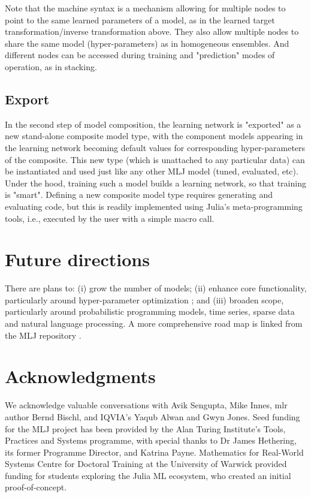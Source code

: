 \documentclass{article}
\begin{document}

Note that the machine syntax is a mechanism allowing for multiple
nodes to point to the same learned parameters of a model, as in the
learned target transformation/inverse transformation above. They also
allow multiple nodes to share the same model (hyper-parameters) as in
homogeneous ensembles. And different nodes can be accessed during
training and "prediction" modes of operation, as in stacking.

\subsection{Export}

In the second step of model composition, the learning network is
"exported" as a new stand-alone composite model type, with the
component models appearing in the learning network becoming default
values for corresponding hyper-parameters of the composite. This new
type (which is unattached to any particular data) can be instantiated
and used just like any other MLJ model (tuned, evaluated, etc). Under
the hood, training such a model builds a learning network, so that
training is "smart". Defining a new composite model type requires
generating and evaluating code, but this is readily implemented using
Julia's meta-programming tools, i.e., executed by the user with a
simple macro call.

\section{Future directions}

There are plans to: (i) grow the number of models; (ii) enhance core
functionality, particularly around hyper-parameter optimization
\cite{MLJTuning}; and (iii) broaden scope, particularly around
probabilistic programming models, time series, sparse data and natural
language processing. A more comprehensive road map is linked from the
MLJ repository \cite{MLJ}.

\section*{Acknowledgments}

We acknowledge valuable conversations with Avik Sengupta, Mike Innes,
mlr author Bernd Bischl, and IQVIA's Yaqub Alwan and Gwyn Jones. Seed
funding for the MLJ project has been provided by the Alan Turing
Institute's Tools, Practices and Systems programme, with special thanks
to Dr James Hethering, its former Programme Director, and Katrina
Payne. Mathematics for Real-World Systems Centre for Doctoral Training
at the University of Warwick provided funding for students exploring
the Julia ML ecosystem, who created an initial proof-of-concept.
\end{document}
